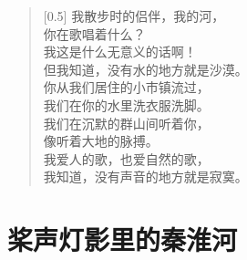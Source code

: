 \documentclass[12pt,UTF-8,openany]{ctexbook}
\begin{document}
\begin{large}
    
    \begin{verse}[0.5\linewidth]
        我散步时的侣伴，我的河， \\
        你在歌唱着什么？ \\
        我这是什么无意义的话啊！ \\
        但我知道，没有水的地方就是沙漠。 \\
        你从我们居住的小市镇流过， \\
        我们在你的水里洗衣服洗脚。 \\
        我们在沉默的群山间听着你， \\
        像听着大地的脉搏。 \\
        我爱人的歌，也爱自然的歌， \\
        我知道，没有声音的地方就是寂寞。
    \end{verse}
    
\end{large}



\chapter{桨声灯影里的秦淮河}
\end{document}

